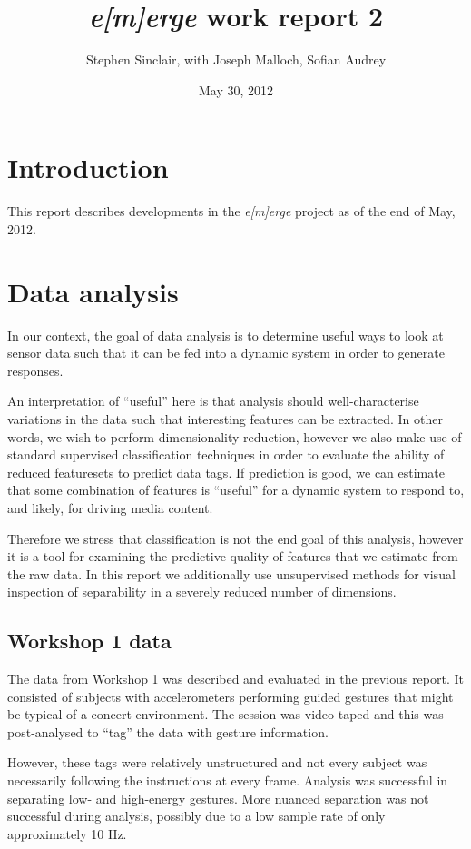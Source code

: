 \documentclass{article}
\title{\emph{e[m]erge} work report 2}
\author{Stephen Sinclair, with Joseph Malloch, Sofian Audrey}
\date{May 30, 2012}
\newcommand{\emerge}{\emph{e[m]erge}\xspace}
\begin{document}
\maketitle

\section{Introduction}

This report describes developments in the \emerge project as of the
end of May, 2012.

\section{Data analysis}

In our context, the goal of data analysis is to determine useful ways
to look at sensor data such that it can be fed into a dynamic system
in order to generate responses.

An interpretation of ``useful'' here is that analysis should
well-characterise variations in the data such that interesting
features can be extracted.
In other words, we wish to perform dimensionality reduction, however
we also make use of standard supervised classification techniques in
order to evaluate the ability of reduced featuresets to predict data
tags.
If prediction is good, we can estimate that some combination of
features is ``useful'' for a dynamic system to respond to, and likely,
for driving media content.

Therefore we stress that classification is not the end goal of this
analysis, however it is a tool for examining the predictive quality of
features that we estimate from the raw data.
In this report we additionally use unsupervised methods for visual
inspection of separability in a severely reduced number of dimensions.

\subsection{Workshop 1 data}

The data from Workshop 1 was described and evaluated in the previous
report.
It consisted of subjects with accelerometers performing guided
gestures that might be typical of a concert environment.
The session was video taped and this was post-analysed to ``tag'' the
data with gesture information.

However, these tags were relatively unstructured and not every subject
was necessarily following the instructions at every frame.
Analysis was successful in separating low- and high-energy gestures.
More nuanced separation was not successful during analysis, possibly
due to a low sample rate of only approximately 10 Hz.
\end{document}

